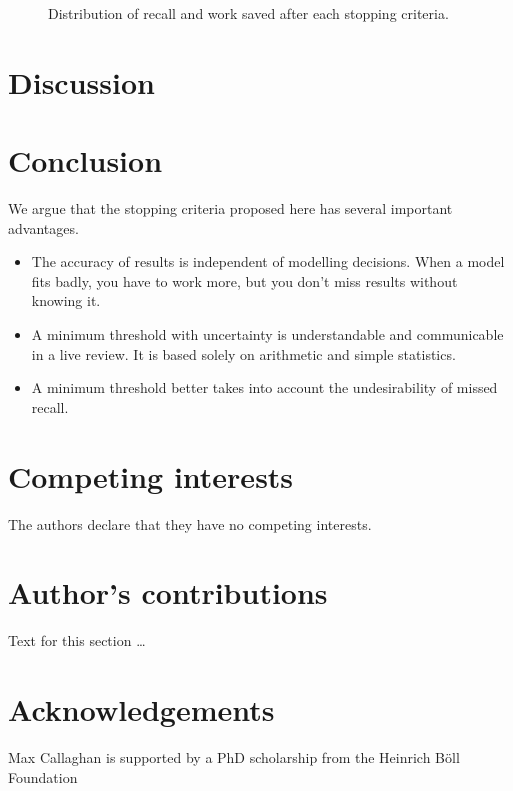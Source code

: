 \documentclass{bmcart}
\begin{document}
\begin{figure}
	\caption{\small Distribution of recall and work saved after each stopping criteria.} 
	\label{recall-wss}
\end{figure}

	
	
	
	
	\section*{Discussion}
	
	\section*{Conclusion}
	
	We argue that the stopping criteria proposed here has several important advantages.
	
	\begin{itemize}
		\item The accuracy of results is independent of modelling decisions. When a model fits badly, you have to work more, but you don't miss results without knowing it.
		\item A minimum threshold with uncertainty is understandable and communicable in a live review. It is based solely on arithmetic and simple statistics.
		\item A minimum threshold better takes into account the undesirability of missed recall.
	\end{itemize}
	
\begin{backmatter}
	
	\section*{Competing interests}
	The authors declare that they have no competing interests.
	
	\section*{Author's contributions}
	Text for this section \ldots
	
	\section*{Acknowledgements}
	Max Callaghan is supported by a PhD scholarship from the Heinrich Böll Foundation
		
	
	
	
\end{backmatter}
\end{document}
